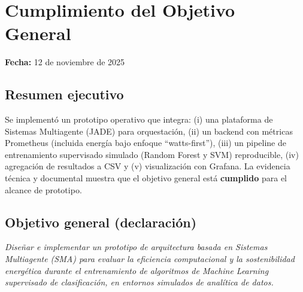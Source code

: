 
\section*{Cumplimiento del Objetivo General}
\noindent\textbf{Fecha:} 12 de noviembre de 2025\\

\subsection*{Resumen ejecutivo}
Se implementó un prototipo operativo que integra: (i) una plataforma de Sistemas Multiagente (JADE) para orquestación, (ii) un backend con métricas Prometheus (incluida energía bajo enfoque ``watts-first''), (iii) un pipeline de entrenamiento supervisado simulado (Random Forest y SVM) reproducible, (iv) agregación de resultados a CSV y (v) visualización con Grafana. La evidencia técnica y documental muestra que el objetivo general está \textbf{cumplido} para el alcance de prototipo.

\subsection*{Objetivo general (declaración)}
\emph{Diseñar e implementar un prototipo de arquitectura basada en Sistemas Multiagente (SMA) para evaluar la eficiencia computacional y la sostenibilidad energética durante el entrenamiento de algoritmos de Machine Learning supervisado de clasificación, en entornos simulados de analítica de datos.}

